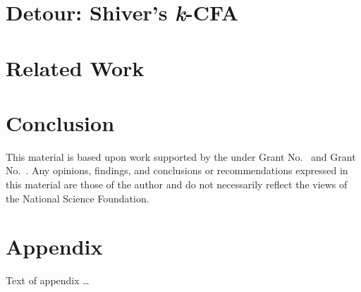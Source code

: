 \documentclass[acmsmall,review,anonymous]{acmart}\settopmatter{printfolios=true,printccs=false,printacmref=false}
\begin{document}
\section{Detour: Shiver's \textit{k}-CFA}

\section{Related Work}

\section{Conclusion}

\begin{acks}                            %
  This material is based upon work supported by the
   under Grant
  No.~ and Grant
  No.~.  Any opinions, findings, and
  conclusions or recommendations expressed in this material are those
  of the author and do not necessarily reflect the views of the
  National Science Foundation.
\end{acks}



\appendix
\section{Appendix}

Text of appendix \ldots
\end{document}

